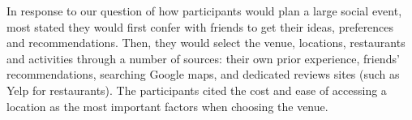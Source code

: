 \documentclass{sigchi}
\begin{document}

In response to our question of how participants would plan a large social event, most stated they would first confer with friends to get their ideas, preferences and recommendations.  Then, they would select the venue, locations, restaurants and activities through a number of sources: their own prior experience, friends' recommendations, searching Google maps, and dedicated reviews sites (such as Yelp for restaurants).  The participants cited the cost and ease of accessing a location as the most important factors when choosing the venue. 

\end{document}
